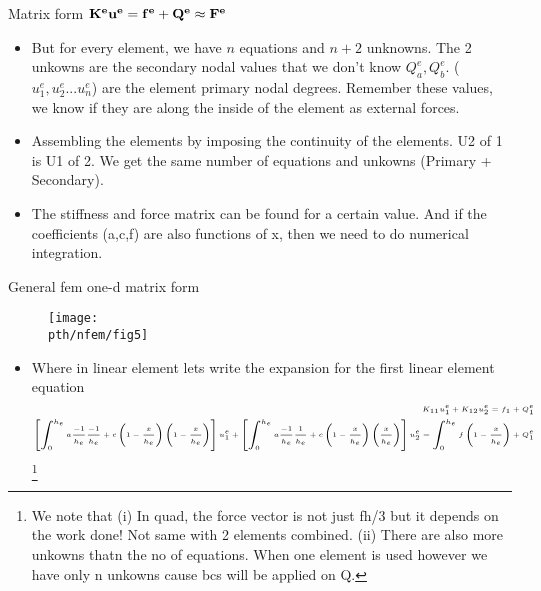 	\begin{frame}
		\begin{block}{Matrix form}
			\centering
			$\mathbf{K^eu^e = f^e + Q^e \approx F^e}$
		\end{block}
		\begin{itemize}
			\item But for every element, we have $n$ equations and $n+2$ unknowns. The 2 unkowns are the secondary nodal values that we don't know $Q_a^e, Q_b^e$. ($u_1^e,u_2^e...u_n^e$) are the element primary nodal degrees. Remember these values, we know if they are along the inside of the element as external forces. 
			\item Assembling the elements by imposing the continuity of the elements. U2 of 1 is U1 of 2. We get the same number of equations and unkowns (Primary + Secondary). 
			\item The stiffness and force matrix can be found for a certain value. And if the coefficients (a,c,f) are also functions of x, then we need to do numerical integration. 
		\end{itemize}
	\end{frame}


	\begin{frame}{General fem one-d matrix form}
		\begin{figure}
			\centering
			\texttt{[image: \\pth/nfem/fig5]} 
		\end{figure}
	
	     \begin{itemize}
	     	\item Where in linear element lets write the expansion for the first linear element equation
	     	\begin{equation}
	     	\tiny
	     	\begin{aligned}
	     		    K_{11}u_1^e + K_{12}u_2^e = {f_1} + Q_1^e \\ 
	     		    \left[\int_{0}^{h_e} a\frac{-1}{h_e}\frac{-1}{h_e} + c\left(1-\frac{x}{h_e} \right)\left(1-\frac{x}{h_e} \right) \right] u_1^e 
	     		    + \left[\int_{0}^{h_e} a\frac{-1}{h_e}\frac{1}{h_e} + c\left(1 -\frac{x}{h_e} \right)\left(\frac{x}{h_e} \right) \right] u_2^e  =  \int_{0}^{h_e} f\left(1-\frac{x}{h_e} \right) + Q_1^e 
	     	\end{aligned}
	     	\end{equation}
	     	\footnote{ We note that (i) In quad, the force vector is not just fh/3 but it depends on the work done! Not same with 2 elements combined. (ii) There are also more unkowns thatn the no of equations. When one element is used however we have only n unkowns cause bcs will be applied on Q.}  
	     \end{itemize}
	\end{frame}


